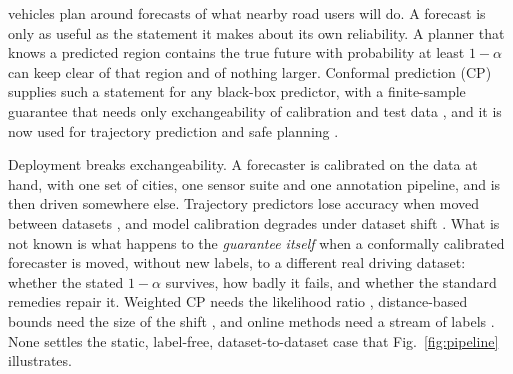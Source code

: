  vehicles plan around forecasts of what nearby road users will do. A forecast is only as
useful as the statement it makes about its own reliability. A planner that knows a predicted region contains the true
future with probability at least $1-\alpha$ can keep clear of that region and of nothing larger. Conformal prediction
(CP) supplies such a statement for any black-box predictor, with a finite-sample guarantee that needs only
exchangeability of calibration and test data \cite{vovk2005algorithmic,angelopoulos2023gentle}, and it is now used for
trajectory prediction and safe planning \cite{lindemann2023safe,sun2024copula,huang2025cuqds,lindemann2024formal}.

Deployment breaks exchangeability. A forecaster is calibrated on the data at hand, with one set of cities, one sensor
suite and one annotation pipeline, and is then driven somewhere else. Trajectory predictors lose accuracy when moved
between datasets \cite{feng2024unitraj,demmler2025dataset}, and model calibration degrades under dataset shift
\cite{ovadia2019can}. What is not known is what happens to the \emph{guarantee itself} when a conformally calibrated
forecaster is moved, without new labels, to a different real driving dataset: whether the stated $1-\alpha$ survives,
how badly it fails, and whether the standard remedies repair it. Weighted CP needs the likelihood ratio
\cite{tibshirani2019covariate}, distance-based bounds need the size of the shift \cite{barber2023beyond,aolaritei2025levy},
and online methods need a stream of labels \cite{gibbs2021adaptive,angelopoulos2023pid}. None settles the static,
label-free, dataset-to-dataset case that Fig.~\ref{fig:pipeline} illustrates.

